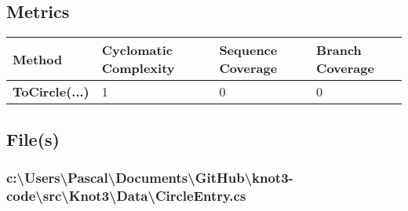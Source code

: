 \documentclass[a4paper,10pt]{article}
\begin{document}
\subsection{Metrics}
\begin{longtable}[l]{|l|l|l|l|}
\hline
\textbf{Method} & \textbf{Cyclomatic Complexity} & \textbf{Sequence Coverage} & \textbf{Branch Coverage}\\
\hline
\textbf{ToCircle(...)} & 1 & 0 & 0\\
\hline
\end{longtable}
\subsection{File(s)}
\subsubsection{c:\textbackslash Users\textbackslash Pascal\textbackslash Documents\textbackslash GitHub\textbackslash knot3-code\textbackslash src\textbackslash Knot3\textbackslash Data\textbackslash CircleEntry.cs}
\end{document}
